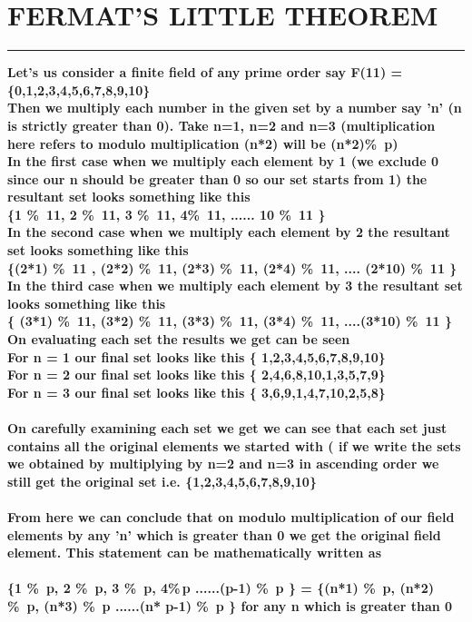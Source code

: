 \documentclass{article}
\begin{document}
\section * {FERMAT'S LITTLE THEOREM}
\hrule 
\bigskip
\textbf{Let's us consider  a finite field of any prime order say  F(11) = \{0,1,2,3,4,5,6,7,8,9,10\} \\
Then we  multiply each number in the given set by a number say 'n' (n is strictly greater than  0). Take  n=1, n=2 and n=3 (multiplication here refers to modulo multiplication (n*2) will be (n*2)\%\ p) 
\\ In the first case when we multiply each element by 1 (we exclude 0 since our n should be greater than 0 so our set starts from 1) the resultant set looks something like this \\
\{1 \%\ 11, 2 \%\ 11, 3 \%\ 11, 4\%\ 11, ...... 10 \%\ 11 \}
\\
In the second case when we multiply each element by 2 the resultant set looks something like this \\ 
\{(2*1) \%\ 11 , (2*2) \%\ 11, (2*3) \%\ 11, (2*4) \%\ 11, .... (2*10) \%\ 11 \} 
\\
In the third case when we multiply each element by 3 the resultant set looks something like this \\ 
\{ (3*1) \%\ 11, (3*2) \%\ 11, (3*3) \%\ 11, (3*4) \%\ 11, ....(3*10) \%\ 11 \} 
\\
On evaluating each set the results we get can be seen \\
For n = 1 our final set looks like this \{ 1,2,3,4,5,6,7,8,9,10\} \\ 
For n = 2 our final set looks like this \{
2,4,6,8,10,1,3,5,7,9\} \\
For n = 3 our final set looks like this \{
3,6,9,1,4,7,10,2,5,8\} \\
\\
On carefully examining each set we get we can see that each set just contains all the original elements we started with ( if we write the sets we obtained by multiplying by n=2 and n=3 in ascending order we still get the original set i.e. \{1,2,3,4,5,6,7,8,9,10\} 
\\
\\
From here we can conclude that on modulo multiplication of our field elements by any 'n' which is greater than 0 we get the original field element. This statement can be mathematically written as \\ \\
\{1 \%\ p, 2 \%\ p, 3 \%\ p, 4\%\,p ......(p-1) \%\ p \} = \{(n*1) \%\ p, (n*2) \%\ p, (n*3) \%\ p ......(n* p-1) \%\ p \} for any n which is greater than 0 
\\
}
\pagebreak
\end{document}
